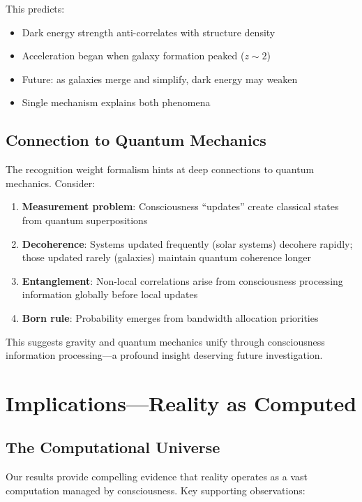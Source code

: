 \documentclass[twocolumn,prd,amsmath,amssymb,aps,superscriptaddress,nofootinbib]{revtex4-2}
\begin{document}
This predicts:
\begin{itemize}
\item Dark energy strength anti-correlates with structure density
\item Acceleration began when galaxy formation peaked ($z \sim 2$)
\item Future: as galaxies merge and simplify, dark energy may weaken
\item Single mechanism explains both phenomena
\end{itemize}

\subsection{Connection to Quantum Mechanics}

The recognition weight formalism hints at deep connections to quantum mechanics. Consider:

\begin{enumerate}
\item \textbf{Measurement problem}: Consciousness ``updates'' create classical states from quantum superpositions
\item \textbf{Decoherence}: Systems updated frequently (solar systems) decohere rapidly; those updated rarely (galaxies) maintain quantum coherence longer
\item \textbf{Entanglement}: Non-local correlations arise from consciousness processing information globally before local updates
\item \textbf{Born rule}: Probability emerges from bandwidth allocation priorities
\end{enumerate}

This suggests gravity and quantum mechanics unify through consciousness information processing---a profound insight deserving future investigation.

\section{Implications---Reality as Computed}
\label{sec:implications}

\subsection{The Computational Universe}

Our results provide compelling evidence that reality operates as a vast computation managed by consciousness. Key supporting observations:
\end{document}
